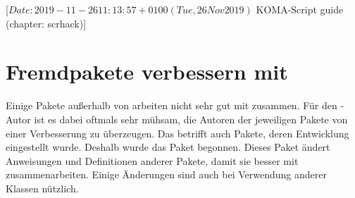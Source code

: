 %
%
%
%
%
%
%
%
% 
%
%
%
%

                 [$Date: 2019-11-26 11:13:57 +0100 (Tue, 26 Nov 2019) $
                  KOMA-Script guide (chapter: scrhack)]

\chapter{Fremdpakete verbessern mit }

\BeginIndexGroup
{}
Einige Pakete außerhalb von \KOMAScript{} arbeiten nicht sehr gut mit
\KOMAScript{} zusammen. Für den \KOMAScript-Autor ist es dabei oftmals sehr
mühsam, die Autoren der jeweiligen Pakete von einer Verbesserung zu
überzeugen. Das betrifft auch Pakete, deren Entwicklung eingestellt
wurde. Deshalb wurde das Paket  begonnen. Dieses Paket ändert
Anweisungen und Definitionen anderer Pakete, damit sie besser mit
\KOMAScript{} zusammenarbeiten. Einige Änderungen sind auch bei
Verwendung anderer Klassen nützlich.

